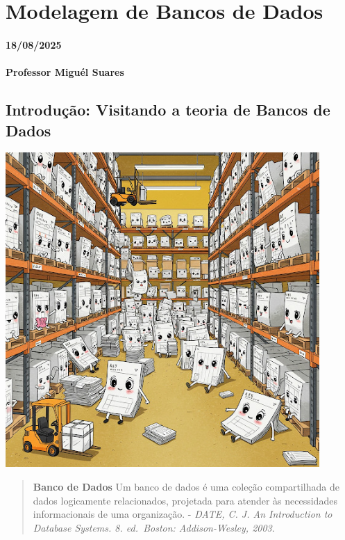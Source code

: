 \documentclass[
]{book}
\begin{document}
\chapter{Modelagem de Bancos de Dados}\label{modelagem-de-bancos-de-dados}

\subsubsection*{18/08/2025}\label{section-2}

\subsubsection*{Professor Miguél Suares}\label{professor-miguuxe9l-suares-2}

\section{Introdução: Visitando a teoria de Bancos de Dados}\label{introduuxe7uxe3o-visitando-a-teoria-de-bancos-de-dados}

\includegraphics[width=4.70833in,height=\textheight]{images/5-bi/01-banco-de-dados.jpg}

\begin{quote}
\textbf{Banco de Dados} Um banco de dados é uma coleção compartilhada de dados logicamente relacionados, projetada para atender às necessidades informacionais de uma organização. - \emph{DATE, C. J. An Introduction to Database Systems. 8. ed.~Boston: Addison-Wesley, 2003}.
\end{quote}
\end{document}
